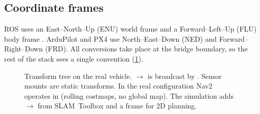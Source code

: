 \subsection{Coordinate frames}
\label{sec:frames}

ROS uses an East--North--Up (ENU) world frame and a Forward--Left--Up (FLU) body
frame \cite{rep103,rep105}. ArduPilot and PX4 use North--East--Down (NED) and
Forward--Right--Down (FRD). All conversions take place at the bridge boundary, so the
rest of the stack sees a single convention (\cref{fig:tf}).

\begin{figure}[H]
\centering
{}
\caption{Transform tree on the real vehicle. $\rightarrow$
is broadcast by . Sensor mounts are static transforms.
In the real configuration Nav2 operates in  (rolling costmaps, no global map).
The simulation adds $\rightarrow$ from SLAM~Toolbox and a
 frame for 2D planning.}
\label{fig:tf}
\end{figure}
